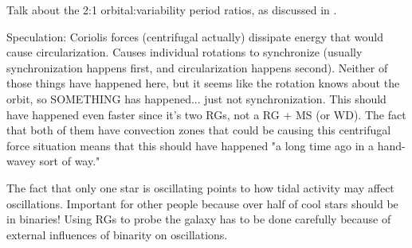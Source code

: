 Talk about the 2:1 orbital:variability period ratios, as discussed in \citet{gau14}.

Speculation:
Coriolis forces (centrifugal actually) dissipate energy that would cause circularization. Causes individual rotations to synchronize (usually synchronization happens first, and circularization happens second). Neither of those things have happened here, but it seems like the rotation knows about the orbit, so SOMETHING has happened... just not synchronization. This should have happened even faster since it's two RGs, not a RG + MS (or WD). The fact that both of them have convection zones that could be causing this centrifugal force situation means that this should have happened "a long time ago in a hand-wavey sort of way."

The fact that only one star is oscillating points to how tidal activity may affect oscillations.
Important for other people because over half of cool stars should be in binaries! Using RGs to probe the galaxy has to be done carefully because of external influences of binarity on oscillations.
    
    
    
    
    